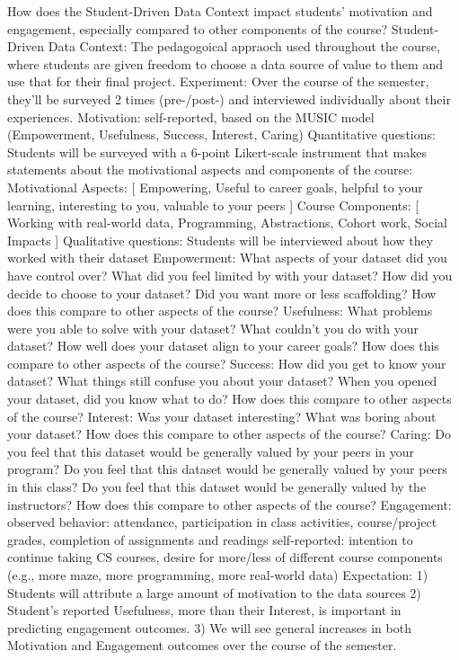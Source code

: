 How does the Student-Driven Data Context impact students' motivation and engagement, especially compared to other components of the course?
    Student-Driven Data Context: The pedagogoical appraoch used throughout the course, where students are given freedom to choose a data source of value to them and use that for their final project.
    Experiment: Over the course of the semester, they'll be surveyed 2 times (pre-/post-) and interviewed individually about their experiences.        
    Motivation: self-reported, based on the MUSIC model (Empowerment, Usefulness, Success, Interest, Caring)
        Quantitative questions:
            Students will be surveyed with a 6-point Likert-scale instrument that makes statements about the motivational aspects and components of the course:
                Motivational Aspects: [ Empowering, Useful to career goals, helpful to your learning, interesting to you, valuable to your peers ]
                Course Components: [ Working with real-world data, Programming, Abstractions, Cohort work, Social Impacts ]
        Qualitative questions:
            Students will be interviewed about how they worked with their dataset
            Empowerment:
                What aspects of your dataset did you have control over? What did you feel limited by with your dataset? How did you decide to choose to your dataset? Did you want more or less scaffolding? How does this compare to other aspects of the course?
            Usefulness:
                What problems were you able to solve with your dataset? What couldn't you do with your dataset? How well does your dataset align to your career goals? How does this compare to other aspects of the course?
            Success:
                How did you get to know your dataset? What things still confuse you about your dataset? When you opened your dataset, did you know what to do? How does this compare to other aspects of the course?
            Interest:
                Was your dataset interesting? What was boring about your dataset? How does this compare to other aspects of the course?
            Caring:
                Do you feel that this dataset would be generally valued by your peers in your program? Do you feel that this dataset would be generally valued by your peers in this class? Do you feel that this dataset would be generally valued by the instructors? How does this compare to other aspects of the course?
    Engagement: 
        observed behavior: attendance, participation in class activities, course/project grades, completion of assignments and readings
        self-reported: intention to continue taking CS courses, desire for more/less of different course components (e.g., more maze, more programming, more real-world data)
    Expectation: 
        1) Students will attribute a large amount of motivation to the data sources
        2) Student's reported Usefulness, more than their Interest, is important in predicting engagement outcomes.
        3) We will see general increases in both Motivation and Engagement outcomes over the course of the semester.



